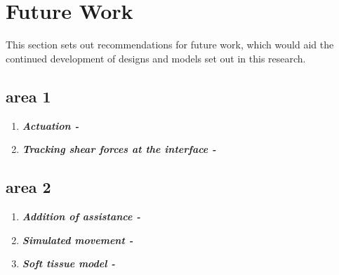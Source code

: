 \section{Future Work}
 This section sets out recommendations for future work, which would aid the continued development of designs and models set out in this research.

\subsection{area 1}
\begin{enumerate}
	\item \textbf{\textit{Actuation - }} 
	
	\item \textbf{\textit{Tracking shear forces at the interface - }} 

\end{enumerate}


\subsection{area 2}
\begin{enumerate}
	\item \textbf{\textit{Addition of assistance -}} 
	
	\item \textbf{\textit{Simulated movement -}} 

	
 	\item \textbf{\textit{Soft tissue model - }}
 	
 \end{enumerate}
